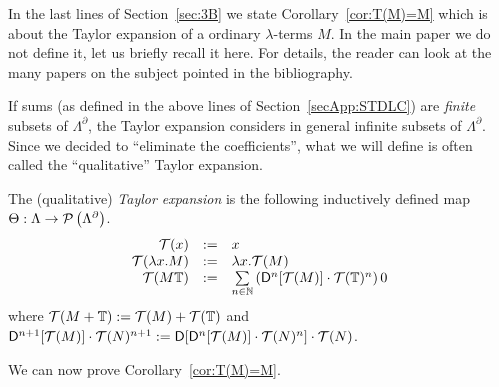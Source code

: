 In the last lines of Section~\ref{sec:3B} we state Corollary~\ref{cor:T(M)=M} which is about the Taylor expansion of a ordinary $\lambda$-terms $M$.
In the main paper we do not define it, let us briefly recall it here.
For details, the reader can look at the many papers on the subject pointed in the bibliography.

If sums (as defined in the above lines of Section~\ref{secApp:STDLC}) are \emph{finite} subsets of $\Lambda^\partial$, the Taylor expansion considers in general infinite subsets of $\Lambda^\partial$.
Since we decided to ``eliminate the coefficients'', what we will define is often called the ``qualitative'' Taylor expansion.

\begin{definition}
 
 The (qualitative) \emph{Taylor expansion} is the following inductively defined map $\Theta : \Lambda \to \mathcal{P}\left(\Lambda^\partial\right)$.
\[\begin{array}{rcl}
 \mathcal{T}(x) & := & x \\
 \mathcal{T}(\lambda x.M) & := & \lambda x.\mathcal{T}(M) \\
 \mathcal{T}(M\mathbb{T}) & := & \sum\limits_{n\in\mathbb{N}} \left(\mathsf{D}^n [\mathcal{T}(M)] \cdot \mathcal{T}(\mathbb{T})^n\right)0
\end{array}\]
where $\mathcal{T}(M+\mathbb{T}):=\mathcal{T}(M)+\mathcal{T}(\mathbb{T})$ and $\mathsf{D}^{n+1} [\mathcal{T}(M)] \cdot \mathcal{T}(N)^{n+1}:=\mathsf{D}[\mathsf{D}^n [\mathcal{T}(M)] \cdot \mathcal{T}(N)^n] \cdot \mathcal{T}(N)$.
\end{definition}

We can now prove Corollary~\ref{cor:T(M)=M}.

